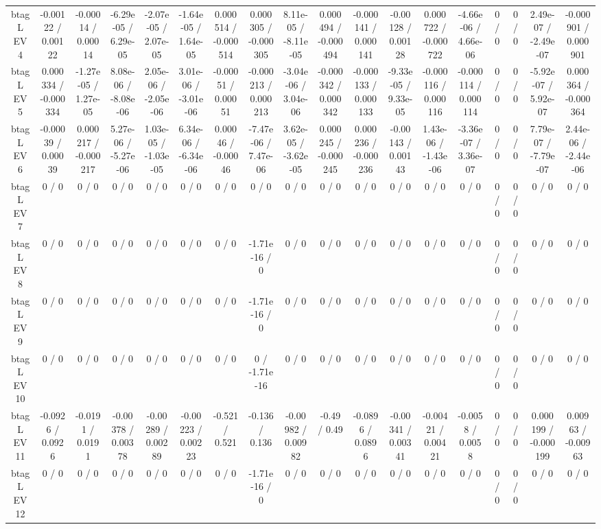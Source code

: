 \documentclass[10pt]{article}
\begin{document}
\begin{table}[htbp]
\begin{center}
\begin{tabular}{|c|c|c|c|c|c|c|c|c|c|c|c|c|c|c|c|c|c|}
  btag L EV 4 & -0.00122 / 0.00122 & -0.00014 / 0.00014 & -6.29e-05 / 6.29e-05 & -2.07e-05 / 2.07e-05 & -1.64e-05 / 1.64e-05 & 0.000514 / -0.000514 & 0.000305 / -0.000305 & 8.11e-05 / -8.11e-05 & 0.000494 / -0.000494 & -0.000141 / 0.000141 & -0.00128 / 0.00128 & 0.000722 / -0.000722 & -4.66e-06 / 4.66e-06 & 0 / 0 & 0 / 0 & 2.49e-07 / -2.49e-07 & -0.000901 / 0.000901 \\ 
  btag L EV 5 & 0.000334 / -0.000334 & -1.27e-05 / 1.27e-05 & 8.08e-06 / -8.08e-06 & 2.05e-06 / -2.05e-06 & 3.01e-06 / -3.01e-06 & -0.00051 / 0.00051 & -0.000213 / 0.000213 & -3.04e-06 / 3.04e-06 & -0.000342 / 0.000342 & -0.000133 / 0.000133 & -9.33e-05 / 9.33e-05 & -0.000116 / 0.000116 & -0.000114 / 0.000114 & 0 / 0 & 0 / 0 & -5.92e-07 / 5.92e-07 & 0.000364 / -0.000364 \\ 
  btag L EV 6 & -0.00039 / 0.00039 & 0.000217 / -0.000217 & 5.27e-06 / -5.27e-06 & 1.03e-05 / -1.03e-05 & 6.34e-06 / -6.34e-06 & 0.00046 / -0.00046 & -7.47e-06 / 7.47e-06 & 3.62e-05 / -3.62e-05 & 0.000245 / -0.000245 & 0.000236 / -0.000236 & -0.00143 / 0.00143 & 1.43e-06 / -1.43e-06 & -3.36e-07 / 3.36e-07 & 0 / 0 & 0 / 0 & 7.79e-07 / -7.79e-07 & 2.44e-06 / -2.44e-06 \\ 
  btag L EV 7 & 0 / 0 & 0 / 0 & 0 / 0 & 0 / 0 & 0 / 0 & 0 / 0 & 0 / 0 & 0 / 0 & 0 / 0 & 0 / 0 & 0 / 0 & 0 / 0 & 0 / 0 & 0 / 0 & 0 / 0 & 0 / 0 & 0 / 0 \\ 
  btag L EV 8 & 0 / 0 & 0 / 0 & 0 / 0 & 0 / 0 & 0 / 0 & 0 / 0 & -1.71e-16 / 0 & 0 / 0 & 0 / 0 & 0 / 0 & 0 / 0 & 0 / 0 & 0 / 0 & 0 / 0 & 0 / 0 & 0 / 0 & 0 / 0 \\ 
  btag L EV 9 & 0 / 0 & 0 / 0 & 0 / 0 & 0 / 0 & 0 / 0 & 0 / 0 & -1.71e-16 / 0 & 0 / 0 & 0 / 0 & 0 / 0 & 0 / 0 & 0 / 0 & 0 / 0 & 0 / 0 & 0 / 0 & 0 / 0 & 0 / 0 \\ 
  btag L EV 10 & 0 / 0 & 0 / 0 & 0 / 0 & 0 / 0 & 0 / 0 & 0 / 0 & 0 / -1.71e-16 & 0 / 0 & 0 / 0 & 0 / 0 & 0 / 0 & 0 / 0 & 0 / 0 & 0 / 0 & 0 / 0 & 0 / 0 & 0 / 0 \\ 
  btag L EV 11 & -0.0926 / 0.0926 & -0.0191 / 0.0191 & -0.00378 / 0.00378 & -0.00289 / 0.00289 & -0.00223 / 0.00223 & -0.521 / 0.521 & -0.136 / 0.136 & -0.00982 / 0.00982 & -0.49 / 0.49 & -0.0896 / 0.0896 & -0.00341 / 0.00341 & -0.00421 / 0.00421 & -0.0058 / 0.0058 & 0 / 0 & 0 / 0 & 0.000199 / -0.000199 & 0.00963 / -0.00963 \\ 
  btag L EV 12 & 0 / 0 & 0 / 0 & 0 / 0 & 0 / 0 & 0 / 0 & 0 / 0 & -1.71e-16 / 0 & 0 / 0 & 0 / 0 & 0 / 0 & 0 / 0 & 0 / 0 & 0 / 0 & 0 / 0 & 0 / 0 & 0 / 0 & 0 / 0 \\ 

\end{tabular}
\end{center}
\end{table}
\end{document}
